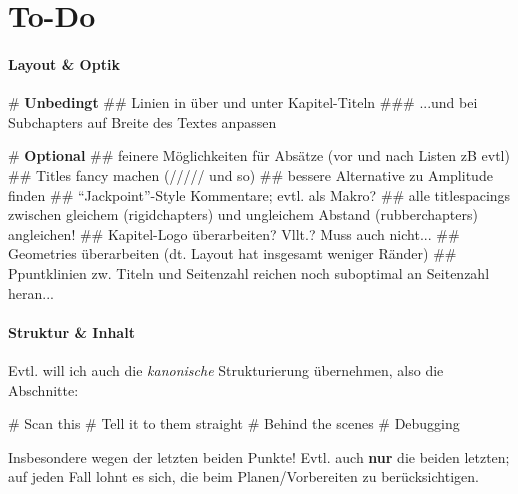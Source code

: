 \chapter{To-Do}

\subsubsection{Layout \& Optik}

\begin{easylist}
    #  \textbf{Unbedingt}
    ## Linien in über und unter Kapitel-Titeln
    ### ...und bei Subchapters auf Breite des Textes anpassen
    
    #  \textbf{Optional}
    ## feinere Möglichkeiten für Absätze (vor und nach Listen zB evtl)
    ## Titles fancy machen (///// und so)
    ## bessere Alternative zu Amplitude finden 
    ## ``Jackpoint''-Style Kommentare; evtl. als Makro?
    ## alle titlespacings zwischen gleichem (rigidchapters) und ungleichem Abstand (rubberchapters) angleichen!
    ## Kapitel-Logo überarbeiten? Vllt.? Muss auch nicht...
    ## Geometries überarbeiten (dt. Layout hat insgesamt weniger Ränder)
    ## Ppuntklinien zw. Titeln und Seitenzahl reichen noch suboptimal an Seitenzahl heran...
\end{easylist}

\subsubsection{Struktur \& Inhalt}

Evtl. will ich auch die \textit{kanonische} Strukturierung übernehmen, also die Abschnitte:

\begin{easylist}
    # Scan this
    # Tell it to them straight
    # Behind the scenes
    # Debugging
\end{easylist}

Insbesondere wegen der letzten beiden Punkte! Evtl. auch \textbf{nur} die beiden letzten; auf jeden Fall lohnt es sich, die beim Planen/Vorbereiten zu berücksichtigen.